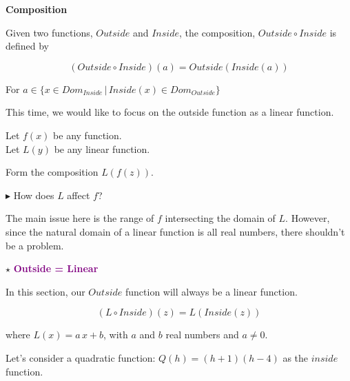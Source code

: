 \documentclass{ximera}
\begin{document}
\begin{idea} \textbf{\textcolor{blue!55!black}{Composition}}  


Given two functions, $Outside$ and $Inside$, the composition, $Outside \circ Inside$ is defined by

\[      (Outside \circ Inside)(a) = Outside(Inside(a))        \]

For $ a \in \{  x \in Dom_{Inside} \, | \,    Inside(x) \in Dom_{Outside}  \}$

\end{idea}



This time, we would like to focus on the outside function as a linear function.




Let $f(x)$ be any function. \\
Let $L(y)$ be any linear function. 


Form the composition $L(f(z))$. 

$\blacktriangleright$ How does $L$ affect $f$?




The main issue here is the range of $f$ intersecting the domain of $L$.  However, since the natural domain of a linear function is all real numbers, there shouldn't be a problem.






$\star$ \textbf{\textcolor{purple}{Outside = Linear}}


In this section, our $Outside$ function will always be a linear function.



\[      (L \circ Inside)(z) = L(Inside(z))        \]


where $L(x) = a \, x + b$, with $a$ and $b$ real numbers and $a \ne 0$.



Let's consider a quadratic function: $Q(h) = (h+1)(h-4)$ as the $inside$ function.
\end{document}
